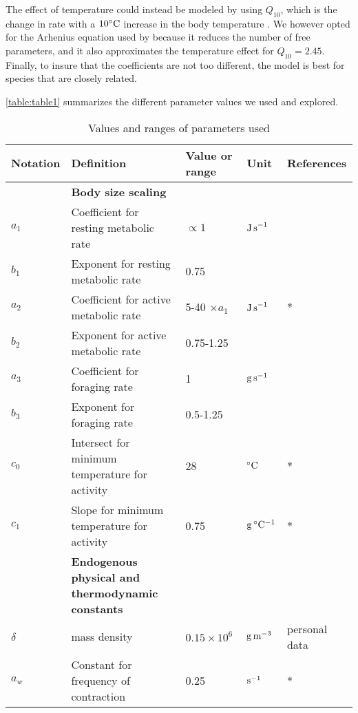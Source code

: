 The effect of temperature could instead be modeled by using $Q_{10}$, which is the change in rate with a $10^ {\circ} \rm{C}$ increase in the body temperature \citep{Precht1973}. %
We however opted for the Arhenius equation used by \citet{Brown2004} because it reduces the number of free parameters, and it also approximates the temperature effect for $Q_{10} = 2.45$.  
Finally, to  insure that the coefficients are not too different, the model is best for species that are closely related. %

\cref{table:table1} summarizes the different parameter values we used and explored.

\begin{sidewaystable}
\caption{Values and ranges of parameters used }
\begin{tabular}{l l l l l}
\hline
Notation& Definition & Value or range & Unit & References \\ 
\hline
&\textbf{ Body size scaling} & & &  \\ 
$a_1$ & Coefficient for resting metabolic rate  & $\propto 1$  & $\rm{J \, s}^{-1}$ & \citet{Heinrich1975} \\
$b_1$ & Exponent for resting metabolic rate  & 0.75 &  & \citet{Kleiber1947,Peters1986,Gillooly2001} \\
$a_2$ & Coefficient for active metabolic rate  & 5-40 $ \times a_1$ & $\rm{J \, s}^{-1}$ &  \citet{Bartholomew1981}* \\
$b_2$ & Exponent for active metabolic rate  & 0.75-1.25 & &  \citet{Heinrich1975} \\
$a_3$ & Coefficient for foraging rate  & 1 & $\rm{g \, s}^{-1}$  & \\
$b_3$ & Exponent  for foraging rate  & 0.5-1.25 &  &  \citet{Pawar2012, Nervo2014,Maino2015} \\
$c_0$ & Intersect for minimum temperature for activity & 28 & $^{\circ}\rm{C}$  & \citep{Bartholomew1977a}* \\
$c_1$ & Slope for minimum temperature for activity & 0.75 &  $\rm{g \,  ^{\circ}C^{-1}}$ &  \citep{Bartholomew1977a}* \\
\hline
& \textbf{Endogenous physical and thermodynamic constants} & & &  \\
$\delta $ & mass density & $0.15 \times 10^6$  & $\rm{g \, m}^{-3}$  & personal data\\
$a_w$& Constant for frequency of contraction & 0.25 & $\rm{s}^{-1}$   & \citet{Bartholomew1977b}*\\

\end{tabular}
\end{sidewaystable}
